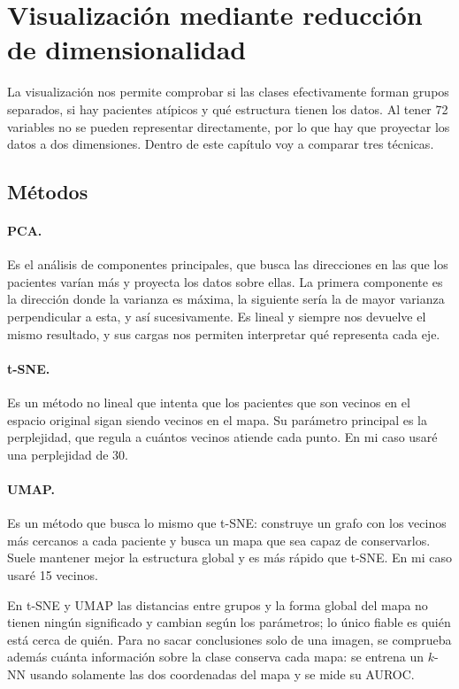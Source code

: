 \clearpage
\section{Visualización mediante reducción de dimensionalidad}\label{cap:visualizacion}

La visualización nos permite comprobar si las clases efectivamente forman grupos separados, si hay pacientes atípicos y qué estructura tienen los datos. Al tener 72 variables no se pueden representar directamente, por lo que hay que proyectar los datos a dos dimensiones. Dentro de este capítulo voy a comparar tres técnicas.

\subsection{Métodos}

\paragraph{PCA.} Es el análisis de componentes principales, que busca las direcciones en las que los pacientes varían más y proyecta los datos sobre ellas. La primera componente es la dirección donde la varianza es máxima, la siguiente sería la de mayor varianza perpendicular a esta, y así sucesivamente. Es lineal y siempre nos devuelve el mismo resultado, y sus cargas nos permiten interpretar qué representa cada eje.

\paragraph{t-SNE.} Es un método no lineal que intenta que los pacientes que son vecinos en el espacio original sigan siendo vecinos en el mapa. Su parámetro principal es la perplejidad, que regula a cuántos vecinos atiende cada punto. En mi caso usaré una perplejidad de 30.

\paragraph{UMAP.} Es un método que busca lo mismo que t-SNE: construye un grafo con los vecinos más cercanos a cada paciente y busca un mapa que sea capaz de conservarlos. Suele mantener mejor la estructura global y es más rápido que t-SNE. En mi caso usaré 15 vecinos.

En t-SNE y UMAP las distancias entre grupos y la forma global del mapa no tienen ningún significado y cambian según los parámetros; lo único fiable es quién está cerca de quién. Para no sacar conclusiones solo de una imagen, se comprueba además cuánta información sobre la clase conserva cada mapa: se entrena un $k$-NN usando solamente las dos coordenadas del mapa y se mide su AUROC.

